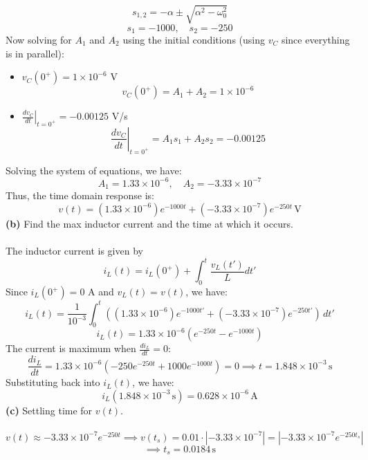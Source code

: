 \documentclass[12pt]{article}
\begin{document}
\[s_{1,2}=-\alpha \pm \sqrt{\alpha^2 - \omega_0^2}\]
\[s_1 = -1000,\quad s_2 = -250\]
Now solving for $A_1$ and $A_2$ using the initial conditions (using $v_C$ since everything is in parallel):
\begin{itemize}
    \item $v_C(0^+) = 1\times10^{-6}$ V
    \[v_C(0^+) = A_1 + A_2 = 1\times10^{-6}\]
    \item $\left.\frac{dv_C}{dt}\right|_{t=0^+} = -0.00125$ V/s
    \[ \left.\frac{dv_C}{dt}\right|_{t=0^+} = A_1s_1 + A_2s_2 = -0.00125 \]
\end{itemize}
Solving the system of equations, we have:
\[A_1 = 1.33\times10^{-6},\quad A_2 = -3.33\times10^{-7}\]
Thus, the time domain response is:
\[\boxed{v(t) = (1.33\times10^{-6})e^{-1000t} + (-3.33\times10^{-7})e^{-250t}\,\text{V}}\]
\textbf{(b)} Find the max inductor current and the time at which it occurs.\\\\
The inductor current is given by
\[i_L(t)=i_L(0^+) + \int_0^t \frac{v_L(t')}{L} dt'\]
Since $i_L(0^+) = 0$ A and $v_L(t) = v(t)$, we have:
\[i_L(t)= \frac{1}{10^{-3}}\int_0^t ((1.33\times10^{-6})e^{-1000t'} + (-3.33\times10^{-7})e^{-250t'})\,dt'\]
\[i_L(t)= 1.33\times10^{-6}(e^{-250t}-e^{-1000t})\]
The current is maximum when $\frac{di_L}{dt} = 0$:
\[\frac{di_L}{dt} = 1.33\times10^{-6}(-250e^{-250t}+1000e^{-1000t})=0\implies \boxed{t=1.848\times10^{-3}\,\text{s}}\]
Substituting back into $i_L(t)$, we have:
\[\boxed{i_L(1.848\times10^{-3}\,\text{s}) = 0.628\times10^{-6}\,\text{A}}\]
\textbf{(c)} Settling time for $v(t)$.\\\\
\[v(t)\approx -3.33\times10^{-7}e^{-250t}\implies v(t_s) = 0.01\cdot|-3.33\times10^{-7}|=|-3.33\times10^{-7}e^{-250t_s}|\]
\[\implies \boxed{t_s = 0.0184\,\text{s}}\]
\end{document}
